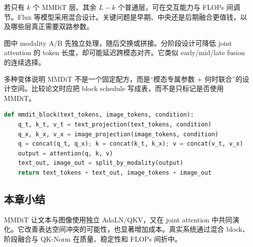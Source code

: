 
若只有 $k$ 个 MMDiT 层、其余 $L-k$ 个普通层，可在交互能力与 FLOPs 间调节。Flux 等模型采用混合设计。关键问题是早期、中央还是后期融合更值钱，以及哪些层真正需要双路参数。


图中 modality A/B 先独立处理，随后交换或拼接。分阶段设计可降低 joint attention 的 token 长度，却可能延迟跨模态对齐。它类似 early/mid/late fusion 的连续选择。


多种变体说明 MMDiT 不是一个固定配方，而是“模态专属参数 + 何时联合”的设计空间。比较论文时应把 block schedule 写成表，而不是只标记是否使用 MMDiT。

\begin{lstlisting}[language=Python,caption={MMDiT block：独立 QKV，联合 attention，再按模态切分}]
def mmdit_block(text_tokens, image_tokens, condition):
    q_t, k_t, v_t = text_projection(text_tokens, condition)
    q_x, k_x, v_x = image_projection(image_tokens, condition)
    q = concat(q_t, q_x); k = concat(k_t, k_x); v = concat(v_t, v_x)
    output = attention(q, k, v)
    text_out, image_out = split_by_modality(output)
    return text_tokens + text_out, image_tokens + image_out
\end{lstlisting}

\subsection{本章小结}

MMDiT 让文本与图像使用独立 AdaLN/QKV，又在 joint attention 中共同演化。它改善表达空间冲突的可能性，也显著增加成本。真实系统通过混合 block、阶段融合与 QK-Norm 在质量、稳定性和 FLOPs 间折中。

